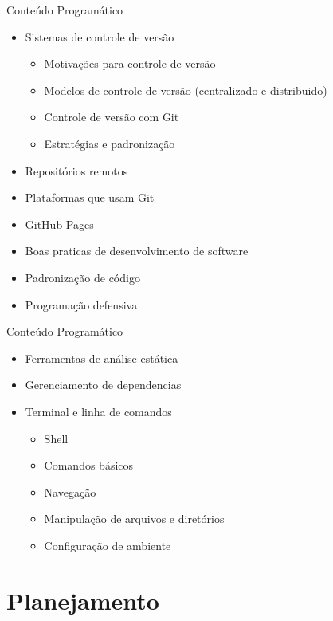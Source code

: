 \documentclass{beamer}
\begin{document}
\begin{frame}[fragile]{Conteúdo Programático}

\begin{itemize}
      \item Sistemas de controle de versão
      \begin{itemize}
            \item Motivações para controle de versão
            \item Modelos de controle de versão (centralizado e distribuido)
            \item Controle de versão com Git
            \item Estratégias e padronização
      \end{itemize}
      \item Repositórios remotos
      \item Plataformas que usam Git
      \item GitHub Pages
      \item Boas praticas de desenvolvimento de software
      \item Padronização de código
      \item Programação defensiva
\end{itemize}
\end{frame}

\begin{frame}[fragile]{Conteúdo Programático}

      \begin{itemize}
            \item Ferramentas de análise estática
            \item Gerenciamento de dependencias
            \item Terminal e linha de comandos
            \begin{itemize}
                  \item Shell
                  \item Comandos básicos
                  \item Navegação
                  \item Manipulação de arquivos e diretórios
                  \item Configuração de ambiente
            \end{itemize} 
      \end{itemize}
      \end{frame}
      



\section{Planejamento}
\end{document}
